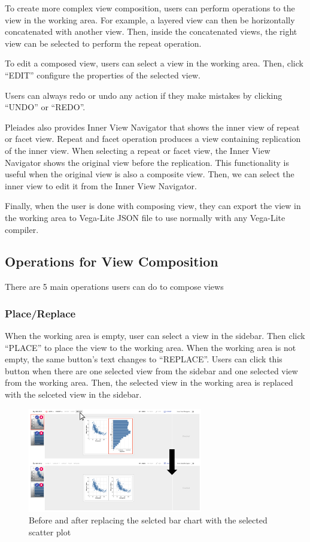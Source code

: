 \documentclass[journal]{vgtc}                %
\begin{document}
To create more complex view composition, users can perform operations to the view
in the working area. For example, a layered view can then be horizontally concatenated
with another view. Then, inside the concatenated views, the right view can be selected
to perform the repeat operation.

To edit a composed view, users can select a view in the working area. Then, click
``EDIT'' configure the properties of the selected view.

Users can always redo or undo any action if they make mistakes by clicking ``UNDO''
or ``REDO''.

Pleiades also provides Inner View Navigator that shows the inner view of repeat
or facet view. Repeat and facet operation produces a view containing replication
of the inner view. When selecting a repeat or facet view, the Inner View Navigator
shows the original view before the replication. This functionality is useful when
the original view is also a composite view. Then, we can select the inner view to
edit it from the Inner View Navigator.

Finally, when the user is done with composing view, they can export the view in
the working area to Vega-Lite JSON file to use normally with any Vega-Lite compiler.


\subsection{Operations for View Composition}
There are 5 main operations users can do to compose views

\subsubsection{Place/Replace}
When the working area is empty, user can select a view in the sidebar. Then click
“PLACE” to place the view to the working area. When the working area is not empty,
the same button's text changes to ``REPLACE''. Users can click this button when
there are one selected view from the sidebar and one selected view from the working
area. Then, the selected view in the working area is replaced with the selceted
view in the sidebar.

\begin{figure}[htb]
 \centering
 \includegraphics[width=3in]{replace.png}
 \caption{Before and after replacing the selcted bar chart with the selected scatter plot}
\end{figure}
\end{document}
